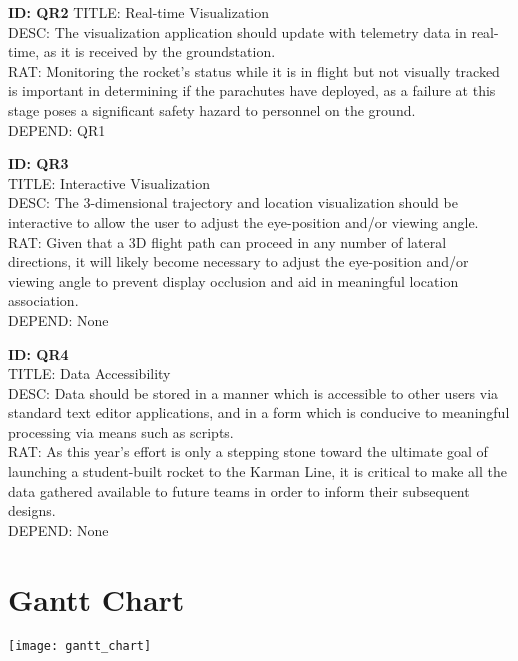 \documentclass[onecolumn, draftclsnofoot,10pt, compsoc]{IEEEtran}
\begin{document}
			\noindent
			\textbf{ID: QR2}
			TITLE: Real-time Visualization\\
			DESC: The visualization application should update with telemetry data in real-time, as it is received by the groundstation.\\
			RAT: Monitoring the rocket's status while it is in flight but not visually tracked is important in determining if the parachutes have deployed, as a failure at this stage poses a significant safety hazard to personnel on the ground. \\
			DEPEND: QR1
			
			\noindent
			\textbf{ID: QR3}\\
			TITLE: Interactive Visualization\\
			DESC: The 3-dimensional trajectory and location visualization should be interactive to allow the user to adjust the eye-position and/or viewing angle.\\
			RAT: Given that a 3D flight path can proceed in any number of lateral directions, it will likely become necessary to adjust the eye-position and/or viewing angle to prevent display occlusion and aid in meaningful location association.\\
			DEPEND: None
			
			\noindent
			\textbf{ID: QR4}\\
			TITLE: Data Accessibility\\
			DESC: Data should be stored in a manner which is accessible to other users via standard text editor applications, and in a form which is conducive to meaningful processing via means such as scripts.\\
			RAT: As this year's effort is only a stepping stone toward the ultimate goal of launching a student-built rocket to the Karman Line, it is critical to make all the data gathered available to future teams in order to inform their subsequent designs.\\
			DEPEND: None


	\section{Gantt Chart}
		\texttt{[image: gantt\_chart]}
\end{document}
